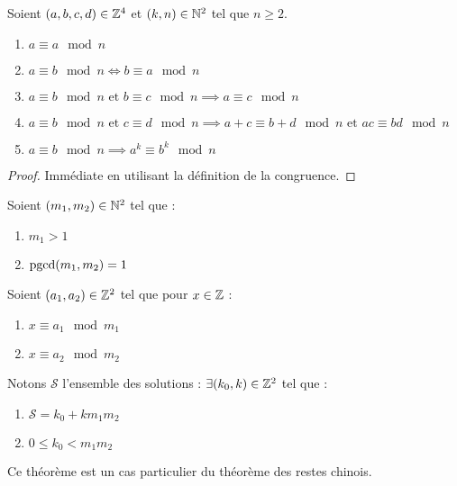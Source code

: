 \begin{proposition}
	Soient $(a, b, c, d) \in \mathbb{Z}^4$ et $(k, n) \in \mathbb{N}^2$ tel que $n \geq 2$.
	\begin{enumerate}
		\item $a \equiv a \mod n$ 
		\item $a \equiv b \mod n \iff b \equiv a \mod n$ 
		\item $a \equiv b \mod n \text{ et } b \equiv c \mod n \implies a \equiv c \mod n$
		\item $a \equiv b \mod n \text{ et } c \equiv d \mod n \implies a + c \equiv b + d \mod n \text{ et } ac \equiv bd \mod n$
		\item $a \equiv b \mod n \implies a^k \equiv b^k \mod n$
	\end{enumerate}
\end{proposition}

\begin{proof}
	Immédiate en utilisant la définition de la congruence.
\end{proof}

\begin{theorem}
	Soient $(m_1, m_2) \in \mathbb{N}^2$ tel que :
	\begin{enumerate}
		\item $m_1 > 1$
		\item $\operatorname{pgcd}(m_1, m_2) = 1$
	\end{enumerate}
	Soient $(a_1, a_2) \in \mathbb{Z}^2$ tel que pour $x \in \mathbb{Z}$ :
	\begin{enumerate}
		\item $x \equiv a_1 \mod m_1$
		\item $x \equiv a_2 \mod m_2$
	\end{enumerate}
	Notons $\mathcal{S}$ l'ensemble des solutions :
	$\exists (k_0, k) \in \mathbb{Z}^2$ tel que :
	\begin{enumerate}
		\item $\mathcal{S} = k_0 + k m_1 m_2$ 
		\item $0 \leq k_0 < m_1 m_2$
	\end{enumerate}
\end{theorem}

\begin{remark}
	Ce théorème est un cas particulier du théorème des restes chinois.
\end{remark}